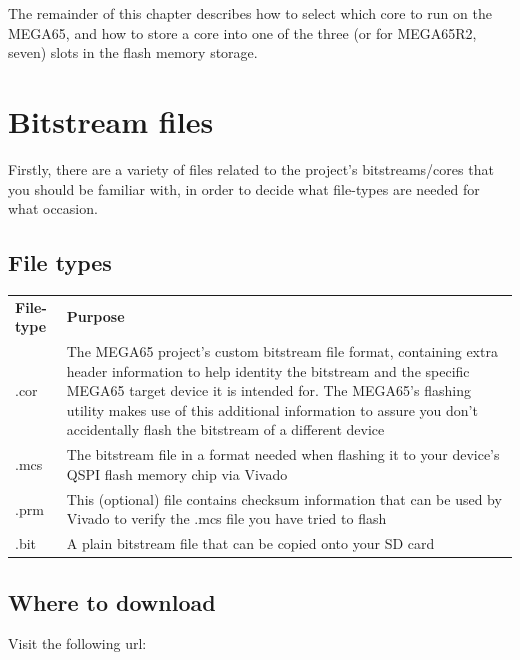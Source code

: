 The remainder of this chapter describes how to select which core to run on the MEGA65, and
how to store a core into one of the three (or for MEGA65R2, seven) slots in the flash memory storage.

\section{Bitstream files}
\label{sec:bitstreamfiles}

Firstly, there are a variety of files related to the project's bitstreams/cores that you should be familiar with, in order to decide what file-types are needed for what occasion.

\subsection{File types}

\begin{center}
  \begin{longtable}{|R{2.2cm}|p{10cm}|}
    \hline
    {\textbf{File-type}} & {\textbf{Purpose}} \\
    \hhline{|=|=|}
    {.cor} & {The MEGA65 project's custom bitstream file format, containing extra header information to help identity the bitstream and the specific MEGA65 target device it is intended for. The MEGA65's flashing utility makes use of this additional information to assure you don't accidentally flash the bitstream of a different device} \\
    \hline
    {.mcs} & {The bitstream file in a format needed when flashing it to your device's QSPI flash memory chip via Vivado} \\
    \hline
    {.prm} & {This (optional) file contains checksum information that can be used by Vivado to verify the .mcs file you have tried to flash} \\
    \hline
    {.bit} & {A plain bitstream file that can be copied onto your SD card} \\
    \hline
  \end{longtable}
\end{center}

\subsection{Where to download}

Visit the following url:

